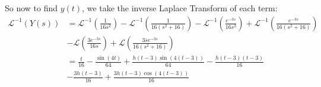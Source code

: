 \documentclass[12pt]{article}
\begin{document}
\begin{enumerate}[label = (\alph*)]
$$		$$
	So now to find $y(t)$, we take the inverse Laplace Transform of each term:
	\begin{align*}
	\mathcal{L}^{-1}(Y(s)) &= \mathcal{L}^{-1}\left(\frac{1}{16s^2}\right) - \mathcal{L}^{-1}\left(\frac{1}{16(s^2 + 16)}\right) - \mathcal{L}^{-1}\left(\frac{e^{-3s}}{16s^2}\right) + \mathcal{L}^{-1}\left(\frac{e^{-3s}}{16(s^2 + 16)}\right) \\
	&- \mathcal{L}\left(\frac{3e^{-3s}}{16s}\right) + \mathcal{L}\left(\frac{3se^{-3s}}{16(s^2 + 16)}\right) \\
	&= \frac{t}{16} - \frac{\sin(4t)}{64} + \frac{h(t-3)\sin(4(t-3))}{64} - \frac{h(t-3)(t-3)}{16} \\
	&- \frac{3h(t-3)}{16} + \frac{3h(t-3)\cos(4(t-3))}{16}  
	\end{align*}
	
\end{enumerate}
\end{document}
